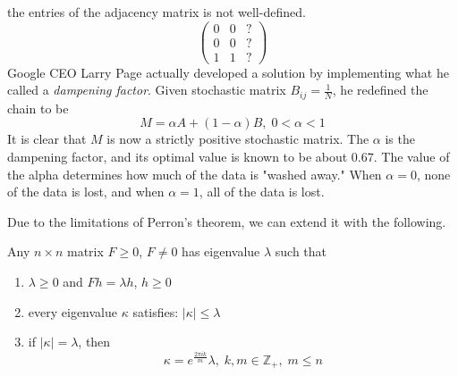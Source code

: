   \begin{figure}[H]
    \centering 
    \label{fig:degenerate_markov_chain}
  \end{figure}
  the entries of the adjacency matrix is not well-defined. 
  \begin{equation}
     \begin{pmatrix} 0&0&? \\0&0&? \\1&1&?\end{pmatrix}
  \end{equation}
  Google CEO Larry Page actually developed a solution by implementing what he called a \textit{dampening factor}. Given stochastic matrix $B_{i j} = \frac{1}{N}$, he redefined the chain to be 
  \begin{equation}
    M = \alpha A + (1-\alpha) B, \; 0< \alpha < 1
  \end{equation}
  It is clear that $M$ is now a strictly positive stochastic matrix. The $\alpha$ is the dampening factor, and its optimal value is known to be about $0.67$. The value of the alpha determines how much of the data is "washed away." When $\alpha = 0$, none of the data is lost, and when $\alpha = 1$, all of the data is lost. 

  Due to the limitations of Perron's theorem, we can extend it with the following.

  \begin{theorem}
    Any $n \times n$ matrix $F \geq 0$, $F \neq 0$ has eigenvalue $\lambda$ such that
    \begin{enumerate}
      \item $\lambda \geq 0$ and $F h = \lambda h$, $h\geq 0$ \item every eigenvalue $\kappa$ satisfies: $|\kappa| \leq \lambda$ 
      \item if $|\kappa| = \lambda$, then 
      \begin{equation}
        \kappa = e^{\frac{2 \pi i k}{m}} \lambda, \; k, m \in \mathbb{Z}_+, \; m \leq n
      \end{equation}
    \end{enumerate}
  \end{theorem}

